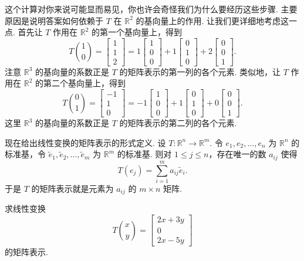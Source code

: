 这个计算对你来说可能显而易见，你也许会奇怪我们为什么要经历这些步骤. 主要原因是说明答案如何依赖于 $T$ 在 $\mathbb{R}^2$ 的基向量上的作用. 让我们更详细地考虑这一点. 首先让 $T$ 作用在 $\mathbb{R}^2$ 的第一个基向量上，得到
\[
T\binom{1}{0}=\begin{bmatrix}1\\1\\2\end{bmatrix}=1\begin{bmatrix}1\\0\\0\end{bmatrix}+1\begin{bmatrix}0\\1\\0\end{bmatrix}+2\begin{bmatrix}0\\0\\1\end{bmatrix}.
\]
注意 $\mathbb{R}^3$ 的基向量的系数正是 $T$ 的矩阵表示的第一列的各个元素. 类似地，让 $T$ 作用在 $\mathbb{R}^2$ 的第二个基向量上，得到
\[
T\binom{0}{1}=\begin{bmatrix}-1\\1\\0\end{bmatrix}=-1\begin{bmatrix}1\\0\\0\end{bmatrix}+1\begin{bmatrix}0\\1\\0\end{bmatrix}+0\begin{bmatrix}0\\0\\1\end{bmatrix}.
\]
这里 $\mathbb{R}^3$ 的基向量的系数正是 $T$ 的矩阵表示的第二列的各个元素.

现在给出线性变换的矩阵表示的形式定义. 设 $T:\mathbb{R}^n\to\mathbb{R}^m$. 令 $e_1,e_2,\ldots,e_n$ 为 $\mathbb{R}^n$ 的标准基，令 $\tilde{e}_1,\tilde{e}_2,\ldots,\tilde{e}_m$ 为 $\mathbb{R}^m$ 的标准基. 则对 $1\leq j\leq n$，存在唯一的数 $a_{ij}$ 使得
\[
T(e_j)=\sum_{i=1}^{m}a_{ij}\tilde{e}_i.
\]
于是 $T$ 的矩阵表示就是元素为 $a_{ij}$ 的 $m\times n$ 矩阵.

\begin{question}\label{q:1-6}
求线性变换
\[
T\binom{x}{y}=\begin{bmatrix}2x+3y\\0\\2x-5y\end{bmatrix}
\]
的矩阵表示.
\end{question}

